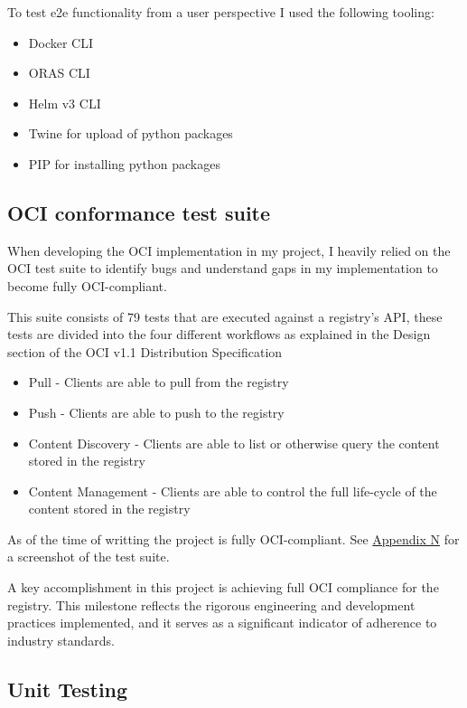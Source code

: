 \documentclass{article}
\begin{document}
  To test e2e functionality from a user perspective I used the following tooling:

  \begin{itemize}
    \item Docker CLI
    \item ORAS CLI
    \item Helm v3 CLI
    \item Twine for upload of python packages
    \item PIP for installing python packages
  \end{itemize}

  \subsection{OCI conformance test suite}

  When developing the OCI implementation in my project, I heavily relied on the OCI test suite to identify bugs and understand gaps in my implementation to become fully OCI-compliant.

  This suite consists of 79 tests that are executed against a registry's API, these tests are divided into the four different workflows as explained in the Design section of the OCI v1.1 Distribution Specification

  \begin{itemize}
    \item Pull - Clients are able to pull from the registry
    \item Push - Clients are able to push to the registry
    \item Content Discovery - Clients are able to list or otherwise query the content stored in the registry
    \item Content Management - Clients are able to control the full life-cycle of the content stored in the registry
  \end{itemize}
  
  As of the time of writting the project is fully OCI-compliant. See \hyperref[sec:appendix-n]{Appendix N} for a screenshot of the test suite.

  A key accomplishment in this project is achieving full OCI compliance for the registry. This milestone reflects the rigorous engineering and development practices implemented, and it serves as a significant indicator of adherence to industry standards.

  \subsection{Unit Testing}
\end{document}
